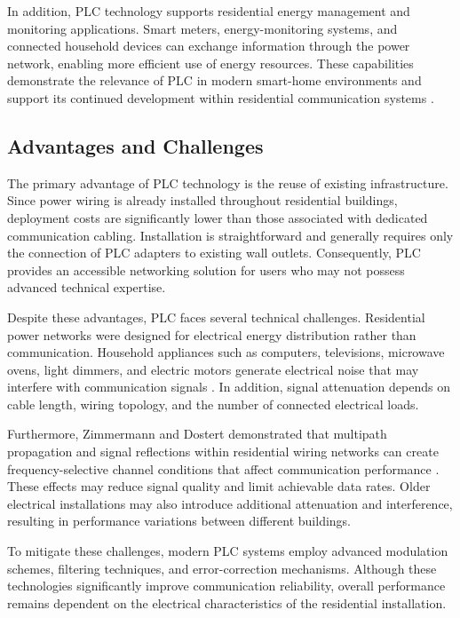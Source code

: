 In addition, PLC technology supports residential energy management and monitoring applications. Smart meters, energy-monitoring systems, and connected household devices can exchange information through the power network, enabling more efficient use of energy resources. These capabilities demonstrate the relevance of PLC in modern smart-home environments and support its continued development within residential communication systems \cite{Galli2011GridSmartGridApplications}.

\subsection{Advantages and Challenges}

The primary advantage of PLC technology is the reuse of existing infrastructure. Since power wiring is already installed throughout residential buildings, deployment costs are significantly lower than those associated with dedicated communication cabling. Installation is straightforward and generally requires only the connection of PLC adapters to existing wall outlets. Consequently, PLC provides an accessible networking solution for users who may not possess advanced technical expertise.

Despite these advantages, PLC faces several technical challenges. Residential power networks were designed for electrical energy distribution rather than communication. Household appliances such as computers, televisions, microwave ovens, light dimmers, and electric motors generate electrical noise that may interfere with communication signals \cite{Ferreira1996PowerLineCommunicationsOverview}. In addition, signal attenuation depends on cable length, wiring topology, and the number of connected electrical loads.

Furthermore, Zimmermann and Dostert demonstrated that multipath propagation and signal reflections within residential wiring networks can create frequency-selective channel conditions that affect communication performance \cite{Zimmermann2002PLCChannelModel}. These effects may reduce signal quality and limit achievable data rates. Older electrical installations may also introduce additional attenuation and interference, resulting in performance variations between different buildings.

To mitigate these challenges, modern PLC systems employ advanced modulation schemes, filtering techniques, and error-correction mechanisms. Although these technologies significantly improve communication reliability, overall performance remains dependent on the electrical characteristics of the residential installation.

